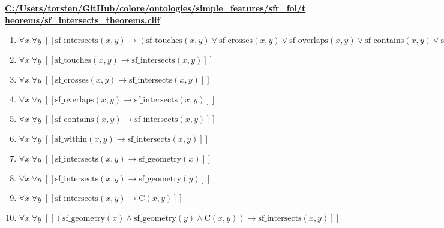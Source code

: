 \documentclass{article}
\begin{document}
\textbf{\url{C:/Users/torsten/GitHub/colore/ontologies/simple\_features/sfr\_fol/theorems/sf\_intersects\_theorems.clif}}

\begin{enumerate}
\item $\forall x\; \forall y\;  \left[ \left[ \textrm{sf\_intersects}(x,y) \rightarrow \left(\textrm{sf\_touches}(x,y) \lor \textrm{sf\_crosses}(x,y) \lor \textrm{sf\_overlaps}(x,y) \lor \textrm{sf\_contains}(x,y) \lor \textrm{sf\_within}(x,y)\right) \right] \right]$
\item $\forall x\; \forall y\;  \left[ \left[ \textrm{sf\_touches}(x,y) \rightarrow \textrm{sf\_intersects}(x,y) \right] \right]$
\item $\forall x\; \forall y\;  \left[ \left[ \textrm{sf\_crosses}(x,y) \rightarrow \textrm{sf\_intersects}(x,y) \right] \right]$
\item $\forall x\; \forall y\;  \left[ \left[ \textrm{sf\_overlaps}(x,y) \rightarrow \textrm{sf\_intersects}(x,y) \right] \right]$
\item $\forall x\; \forall y\;  \left[ \left[ \textrm{sf\_contains}(x,y) \rightarrow \textrm{sf\_intersects}(x,y) \right] \right]$
\item $\forall x\; \forall y\;  \left[ \left[ \textrm{sf\_within}(x,y) \rightarrow \textrm{sf\_intersects}(x,y) \right] \right]$
\item $\forall x\; \forall y\;  \left[ \left[ \textrm{sf\_intersects}(x,y) \rightarrow \textrm{sf\_geometry}(x) \right] \right]$
\item $\forall x\; \forall y\;  \left[ \left[ \textrm{sf\_intersects}(x,y) \rightarrow \textrm{sf\_geometry}(y) \right] \right]$
\item $\forall x\; \forall y\;  \left[ \left[ \textrm{sf\_intersects}(x,y) \rightarrow \textrm{C}(x,y) \right] \right]$
\item $\forall x\; \forall y\;  \left[ \left[ \left(\textrm{sf\_geometry}(x) \land \textrm{sf\_geometry}(y) \land \textrm{C}(x,y)\right) \rightarrow \textrm{sf\_intersects}(x,y) \right] \right]$
\end{enumerate}
\end{document}
